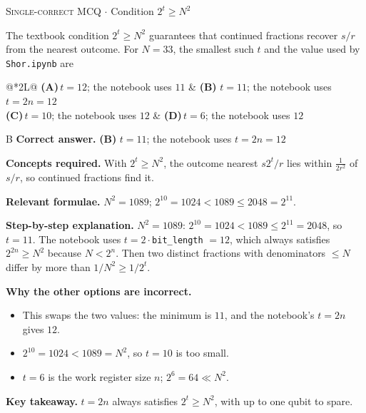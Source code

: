 \documentclass[11pt,a4paper]{article}
\newcommand{\optlabel}[1]{\textbf{(#1)}}
\newcommand{\correctlabel}[1]{\textcolor{okgreen}{\textbf{(#1)}\,\ding{51}}}
\newenvironment{qitem}[1]{\begin{list}{}{\setlength{\leftmargin}{3.3em}\setlength{\labelwidth}{3.1em}%
  \setlength{\labelsep}{0.2em}\setlength{\topsep}{3pt}\setlength{\parsep}{3pt}}\item[\textbf{Q.#1}\hfill]}{\end{list}}
\newcommand{\qsep}{\par\vspace{2pt}{\color{black!15}\hrule}\vspace{4pt}}
\newcommand{\qmeta}[2]{{\footnotesize\color{black!60}\textsc{#1} \;$\cdot$\; #2}\par}
\begin{document}
\begin{qitem}{50}
\qmeta{Single-correct MCQ}{Condition $2^t \ge N^2$}
The textbook condition $2^t \ge N^2$ guarantees that continued fractions recover $s/r$ from the nearest outcome. For $N = 33$, the smallest such
$t$ and the value used by \texttt{Shor.ipynb} are
\par\smallskip\noindent\begin{tabularx}{\linewidth}{@{}*{2}{L}@{}}
\optlabel{A}\,$t = 12$; the notebook uses $11$ & \correctlabel{B}\,$t = 11$; the notebook uses $t = 2n = 12$ \\[3pt]
\optlabel{C}\,$t = 10$; the notebook uses $12$ & \optlabel{D}\,$t = 6$; the notebook uses $12$
\end{tabularx}
\end{qitem}
\begin{solbox}{B}
\textbf{\color{brand}Correct answer.} \textcolor{okgreen}{\textbf{(B)}} $t = 11$; the notebook uses $t = 2n = 12$

\textbf{\color{brand}Concepts required.} With $2^t \ge N^2$, the outcome nearest $s2^t/r$ lies within $\frac{1}{2r^2}$ of $s/r$, so continued fractions find it.

\textbf{\color{brand}Relevant formulae.} $N^2 = 1089$; $2^{10} = 1024 < 1089 \le 2048 = 2^{11}$.

\textbf{\color{brand}Step-by-step explanation.} $N^2 = 1089$: $2^{10} = 1024 < 1089 \le 2^{11} = 2048$, so $t = 11$. The notebook uses $t = 2\cdot$\texttt{bit\_length} $= 12$, which always satisfies $2^{2n} \ge N^2$
because $N < 2^n$. Then two distinct fractions with denominators $\le N$ differ by more than $1/N^2 \ge 1/2^t$.

\textbf{\color{brand}Why the other options are incorrect.}
\begin{itemize}[leftmargin=2.4em, itemsep=1pt, topsep=2pt]
\item[\textbf{(A)}] This swaps the two values: the minimum is $11$, and the notebook's $t = 2n$ gives $12$.
\item[\textbf{(C)}] $2^{10} = 1024 < 1089 = N^2$, so $t = 10$ is too small.
\item[\textbf{(D)}] $t = 6$ is the work register size $n$; $2^6 = 64 \ll N^2$.
\end{itemize}
\textbf{\color{brand}Key takeaway.} $t = 2n$ always satisfies $2^t \ge N^2$, with up to one qubit to spare.
\end{solbox}
\qsep
\end{document}
